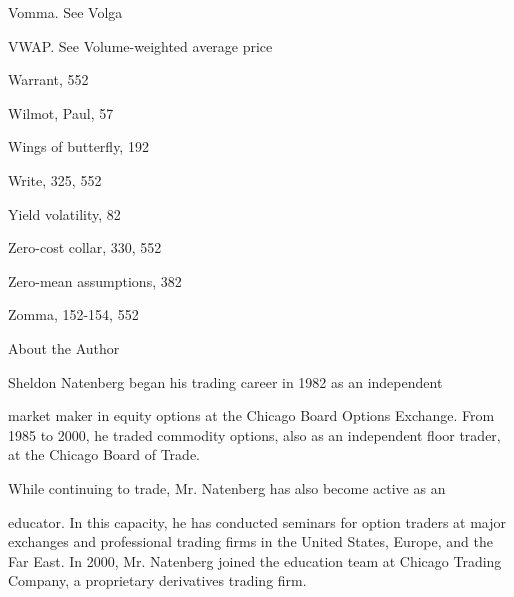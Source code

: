 \noindent Vomma. See Volga\par
\noindent VWAP. See Volume-weighted average price\par
\noindent Warrant, 552\par
\noindent Wilmot, Paul, 57\par
\noindent Wings of butterfly, 192\par
\noindent Write, 325, 552\par
\noindent Yield volatility, 82\par
\noindent Zero-cost collar, 330, 552\par
\noindent Zero-mean assumptions, 382\par
\noindent Zomma, 152-154, 552\par

\noindent About the Author\par
Sheldon Natenberg began his trading career in 1982 as an independent\par
market maker in equity options at the Chicago Board Options Exchange. From 1985 to 2000, he traded commodity options, also as an independent floor trader, at the Chicago Board of Trade.\par
While continuing to trade, Mr. Natenberg has also become active as an\par
educator. In this capacity, he has conducted seminars for option traders at major exchanges and professional trading firms in the United States, Europe, and the Far East. In 2000, Mr. Natenberg joined the education team at Chicago Trading Company, a proprietary derivatives trading firm.\par

